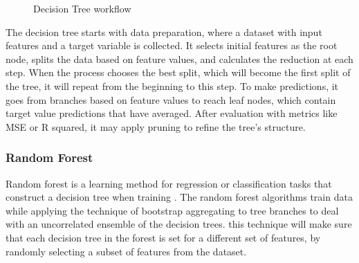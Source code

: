 \begin{figure}[h]
\centering
\caption{Decision Tree workflow} \label{fig:decision-tree-workflow}
\end{figure}


The decision tree starts with data preparation, where a dataset with input features and a target variable is collected. It selects initial features as the root node, splits the data based on feature values, and calculates the reduction at each step. When the process chooses the best split, which will become the first split of the tree, it will repeat from the beginning to this step. To make predictions, it goes from branches based on feature values to reach leaf nodes, which contain target value predictions that have averaged. After evaluation with metrics like MSE or R squared, it may apply pruning to refine the tree’s structure. 

\subsubsection{Random Forest}
Random forest is a learning method for regression or classification tasks that construct a decision tree when training \cite{randForest}. 
The random forest algorithms train data while applying the technique of bootstrap aggregating to tree branches to deal with an uncorrelated ensemble of the decision trees. this technique will make sure that each decision tree in the forest is set for a different set of features, by randomly selecting a subset of features from the dataset. 


